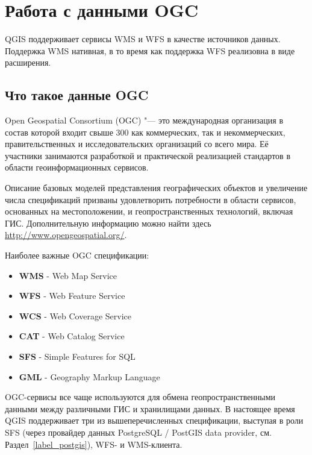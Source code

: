 \chapter{Работа с данными OGC}\label{working_with_ogc}


QGIS поддерживает сервисы WMS и WFS в качестве источников данных. Поддержка
WMS нативная, в то время как поддержка WFS реализовна в виде расширения.

\section{Что такое данные OGC}

Open Geospatial Consortium (OGC) "--- это международная организация в состав
которой входит свыше 300 как коммерческих, так и некоммерческих,
правительственных и исследовательских организаций со всего мира. Её участники
занимаются разработкой и практической реализацией стандартов в области
геоинформационных сервисов.

Описание базовых моделей представления географических объектов и
увеличение числа спецификаций призваны удовлетворить потребности
в области сервисов, основанных на местоположении, и геопространственных
технологий, включая ГИС. Дополнительную информацию можно найти здесь
\url{http://www.opengeospatial.org/}.

Наиболее важные OGC спецификации:

\begin{itemize}[label=--]
\item \textbf{WMS} - Web Map Service
\item \textbf{WFS} - Web Feature Service
\item \textbf{WCS} - Web Coverage Service
\item \textbf{CAT} - Web Catalog Service
\item \textbf{SFS} - Simple Features for SQL
\item \textbf{GML} - Geography Markup Language
\end{itemize}

OGC-сервисы все чаще используются для обмена геопространственными
данными между различными ГИС и хранилищами данных. В настоящее время QGIS
поддерживает три из вышеперечисленных спецификации, выступая в роли SFS
(через провайдер данных PostgreSQL / PostGIS data provider, см.
Раздел~\ref{label_postgis}), WFS- и WMS-клиента.

